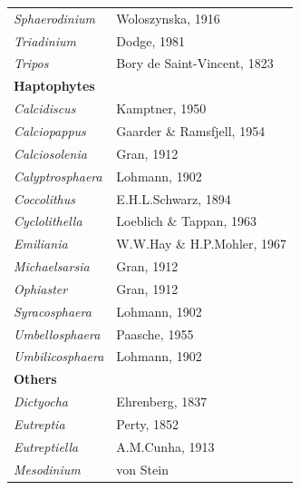 \documentclass[draft]{agujournal2019}
\begin{document}
\begin{table}
{\begin{tabular}{@{}ll@{}}
\textit{Sphaerodinium}     & Woloszynska, 1916                                          \\
\textit{Triadinium}        & Dodge, 1981                                                \\
\textit{Tripos}            & Bory de Saint-Vincent, 1823                                \\
\textbf{Haptophytes}        &                                                            \\
\textit{Calcidiscus}       & Kamptner, 1950                                             \\
\textit{Calciopappus}      & Gaarder \& Ramsfjell, 1954                                 \\
\textit{Calciosolenia}     & Gran, 1912                                                 \\
\textit{Calyptrosphaera}   & Lohmann, 1902                                              \\
\textit{Coccolithus}       & E.H.L.Schwarz, 1894                                        \\
\textit{Cyclolithella}     & Loeblich \& Tappan, 1963                                   \\
\textit{Emiliania}         & W.W.Hay \& H.P.Mohler, 1967                                \\
\textit{Michaelsarsia}     & Gran, 1912                                                 \\
\textit{Ophiaster}         & Gran, 1912                                                 \\
\textit{Syracosphaera}     & Lohmann, 1902                                              \\
\textit{Umbellosphaera}    & Paasche, 1955                                              \\
\textit{Umbilicosphaera}   & Lohmann, 1902                                              \\
\textbf{Others}            &                                                            \\
\textit{Dictyocha}         & Ehrenberg, 1837                                            \\
\textit{Eutreptia}         & Perty, 1852                                                \\
\textit{Eutreptiella}      & A.M.Cunha, 1913                                            \\
\textit{Mesodinium}        & von Stein                                                 
\end{tabular}}

\label{tab:sup:GenusFuncGroups}
\end{table}
\end{document}
